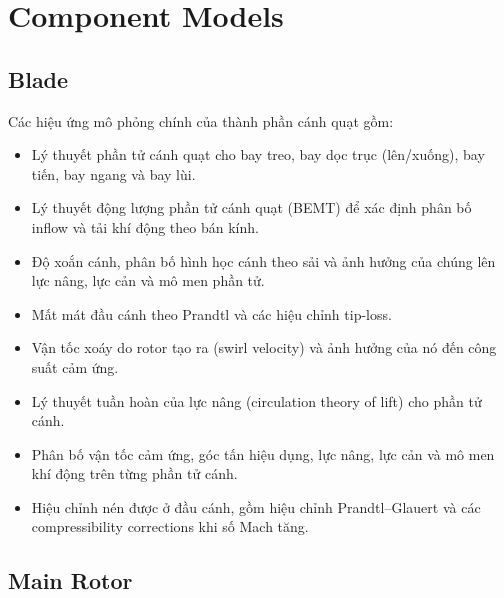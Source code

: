 \documentclass[12pt,a4paper]{article}
\begin{document}
\section{Component Models}

\subsection{Blade}

Các hiệu ứng mô phỏng chính của thành phần cánh quạt gồm:
\begin{itemize}
  \item Lý thuyết phần tử cánh quạt cho bay treo, bay dọc trục (lên/xuống), bay tiến, bay ngang và bay lùi.
  \item Lý thuyết động lượng phần tử cánh quạt (BEMT) để xác định phân bố inflow và tải khí động theo bán kính.
  \item Độ xoắn cánh, phân bố hình học cánh theo sải và ảnh hưởng của chúng lên lực nâng, lực cản và mô men phần tử.
  \item Mất mát đầu cánh theo Prandtl và các hiệu chỉnh tip-loss.
  \item Vận tốc xoáy do rotor tạo ra (swirl velocity) và ảnh hưởng của nó đến công suất cảm ứng.
  \item Lý thuyết tuần hoàn của lực nâng (circulation theory of lift) cho phần tử cánh.
  \item Phân bố vận tốc cảm ứng, góc tấn hiệu dụng, lực nâng, lực cản và mô men khí động trên từng phần tử cánh.
  \item Hiệu chỉnh nén được ở đầu cánh, gồm hiệu chỉnh Prandtl--Glauert và các compressibility corrections khi số Mach tăng.
\end{itemize}

\subsection{Main Rotor}
\end{document}
